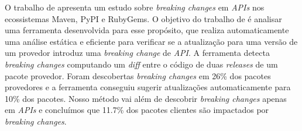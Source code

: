 O trabalho de  apresenta um estudo sobre \textit{breaking changes} em \textit{APIs} nos ecossistemas \textsf{Maven}, \textsf{PyPI} e \textsf{RubyGems}. O objetivo do trabalho de  é analisar uma ferramenta desenvolvida para esse propósito, que realiza automaticamente uma análise estática e eficiente para verificar se a atualização para uma versão de um provedor introduz uma \textit{breaking change} de \textit{API}. A ferramenta detecta \textit{breaking changes} computando um \textit{diff} entre o código de duas \textit{releases} de um pacote provedor. Foram descobertas \textit{breaking changes} em 26\% dos pacotes provedores e a ferramenta conseguiu sugerir atualizações automaticamente para 10\% dos pacotes. Nosso método vai além de descobrir \textit{breaking changes} apenas em \textit{APIs} e concluímos que 11.7\% dos pacotes clientes são impactados por \textit{breaking changes}.